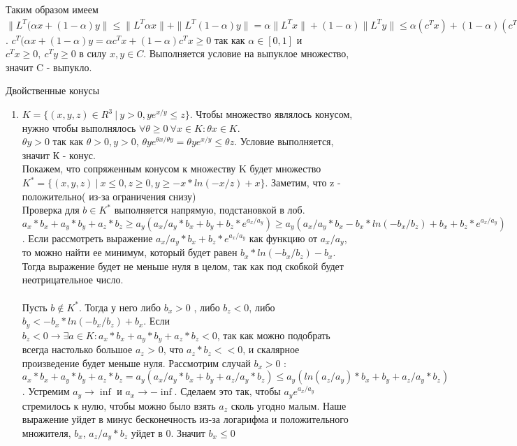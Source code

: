 \documentclass[12pt]{extreport}
\theoremstyle{definiton}
\theoremstyle{definition}
\theoremstyle{definition}
\let\leq\leqslant
\let\geq\geqslant
\begin{document}
\begin{enumerate}
        \\Таким образом имеем $\|L^T(\alpha x + (1-\alpha)y\| \leq \|L^T\alpha x\| + \|L^T(1-\alpha)y\| = \alpha \|L^Tx\| + (1-\alpha)\|L^Ty\| \leq \alpha (c^Tx) + (1-\alpha)(c^Ty) = c^T(\alpha x + (1-\alpha)y) \to \|L^T(\alpha x + (1-\alpha)y\|^2 = (\alpha x + (1-\alpha)y)^TA(\alpha x + (1-\alpha)y \leq (c^T(\alpha x + (1-\alpha)y))^2$. $c^T(\alpha x + (1-\alpha)y = \alpha c^Tx + (1-\alpha)c^Tx \geq 0$ так как $\alpha \in [0,1]$ и $c^Tx \geq 0,\ c^Ty \geq 0$ в силу $x,y \in C$.
        Выполняется условие на выпуклое множество, значит C - выпукло.
    \end{enumerate}


	\PR[] Двойственные конусы
	    \begin{enumerate} 
	        \item $K = \{(x,y,z) \in R^3\ |\ y > 0, ye^{x/y}\leq z \}$. Чтобы множество являлось конусом, нужно чтобы выполнялось $\forall \theta \geq 0\ \forall x \in K: \theta x \in K$.
	        \\$\theta y > 0$ так как $\theta > 0, y > 0$, $\theta y e^{\theta x / \theta y} = \theta y e^{x/y} \leq \theta z$. Условие выполняется, значит К - конус.
	        \\Покажем, что сопряженным конусом к множеству K будет множество $K^*=\{(x,y,z)\ |\ x \leq 0,  z\geq0, y \geq -x*ln(-x/z)+x\}$. Заметим, что z - положительно( из-за ограничения снизу)
	        \\ Проверка для $b \in K^*$ выполняется напрямую, подстановкой в лоб. $a_x*b_x+a_y*b_y+a_z*b_z \geq a_y(a_x/a_y * b_x + b_y + b_z*e^{a_x/a_y}) \geq a_y(a_x/a_y * b_x -b_x*ln(-b_x/b_z)+b_x + b_z*e^{a_x/a_y})$. Если рассмотреть выражение $a_x/a_y * b_x +  b_z*e^{a_x/a_y}$ как функцию от $a_x/a_y$, то можно найти ее минимум, который будет равен $b_x*ln(-b_x/b_z)-b_x$. Тогда выражение будет не меньше нуля в целом, так как под скобкой будет неотрицательное число.
	        \\
	        \\Пусть $b \notin K^*$. Тогда у него либо $b_x > 0$ , либо $b_z < 0$, либо $b_y < -b_x*ln(-b_x/b_z)+b_x$. Если $b_z < 0 \to \exists a \in K: a_x*b_x+a_y*b_y+a_z*b_z < 0$, так как можно подобрать всегда настолько большое $a_z$ > 0, что $a_z*b_z << 0$, и скалярное произведение будет меньше нуля. Рассмотрим случай $b_x > 0$ : $a_x*b_x+a_y*b_y+a_z*b_z = a_y(a_x/a_y * b_x + b_y +a_z/a_y *b_z) \leq a_y(ln(a_z/a_y) * b_x + b_y +a_z/a_y *b_z)$. Устремим $a_y \to \inf$ и $a_x \to -\inf$. Сделаем это так, чтобы $a_ye^{a_x/a_y}$ стремилось к нулю, чтобы можно было взять $a_z$ сколь угодно малым. Наше выражение уйдет в минус бесконечность из-за логарифма и положительного множителя, $b_x$, $a_z/a_y *b_z$ уйдет в 0. Значит $b_x \leq 0$

\end{enumerate}
\end{document}
